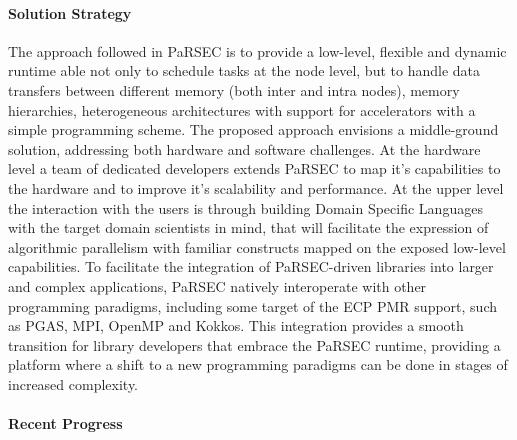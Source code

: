 \paragraph{Solution Strategy}
The approach followed in PaRSEC is to provide a low-level, flexible and dynamic
runtime able not only to schedule tasks at the node level, but to handle data
transfers between different memory (both inter and intra nodes), memory
hierarchies, heterogeneous architectures with support for accelerators with a
simple programming scheme. The proposed approach envisions a middle-ground
solution, addressing both hardware and software challenges. At the hardware
level a team of dedicated developers extends PaRSEC to map it's capabilities to
the hardware and to improve it's scalability and performance. At the upper level
the interaction with the users is through building Domain Specific Languages
with the target domain scientists in mind, that will facilitate the expression
of algorithmic parallelism with familiar constructs mapped on the exposed
low-level capabilities. To facilitate the integration of PaRSEC-driven libraries
into larger and complex applications, PaRSEC natively interoperate with other
programming paradigms, including some target of the ECP PMR support, such as
PGAS, MPI, OpenMP and Kokkos. This integration provides a smooth transition for
library developers that embrace the PaRSEC runtime, providing a platform where a
shift to a new programming paradigms can be done in stages of increased
complexity.

\paragraph{Recent Progress}

